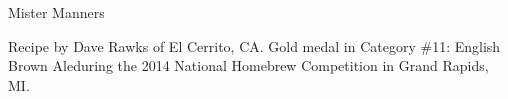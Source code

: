 \documentclass[parskip=half,fontsize=9pt,oneside]{scrbook}
\begin{document}
\mainmatter


\begin{recipe}{Mister Manners}

\begin{aboutblock}
Recipe by Dave Rawks of El Cerrito, CA. Gold medal in Category \#11: English Brown
Aleduring the 2014 National Homebrew Competition in Grand Rapids, MI.
\sourceaha
\end{aboutblock}


\begin{methodandtiming}

\begin{mashsteps}
\end{mashsteps}

\begin{fermentationsteps}
\end{fermentationsteps}

\end{methodandtiming}

\recipebreak

\begin{ingredientsblock}

\begin{malts}
\end{malts}

\begin{hops}
\end{hops}


\end{ingredientsblock}

\end{recipe}


\end{document}
